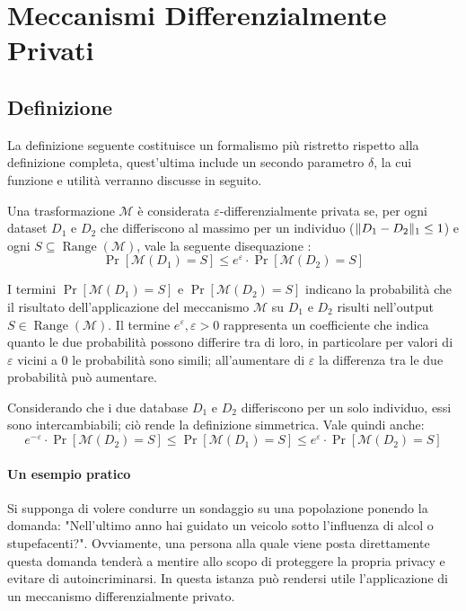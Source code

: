 \chapter{Meccanismi Differenzialmente Privati}

\section{Definizione}
La definizione seguente costituisce un formalismo più ristretto rispetto alla definizione completa, quest'ultima include un secondo parametro $\mathcal{\delta}$, la cui funzione e utilità verranno discusse in seguito.

Una trasformazione $\mathcal{M}$ è considerata $\varepsilon$-differenzialmente privata se, per ogni dataset $D_1$ e $D_2$ che differiscono al massimo per un individuo ($\lVert D_1 - D_2\rVert_1 \le 1$) e ogni $S \subseteq \operatorname{Range}(\mathcal{M})$, vale la seguente disequazione \cite{10.1007/11681878_14}:
\begin{equation}
  \Pr[\mathcal{M}(D_1) = S] \le e^{\varepsilon} \cdot \Pr[\mathcal{M}(D_2) = S]
  \label{eq:e_differential_privacy}
\end{equation}

I termini $\Pr[\mathcal{M}(D_1) = S]$ e $\Pr[\mathcal{M}(D_2) = S]$ indicano la probabilità che il risultato dell'applicazione del meccanismo $\mathcal{M}$ su $D_1$ e $D_2$ risulti nell'output $S \in \operatorname{Range}(\mathcal{M})$.
Il termine $e^\varepsilon, \varepsilon > 0$ rappresenta un coefficiente che indica quanto le due probabilità possono differire tra di loro, in particolare per valori di $\varepsilon$ vicini a $0$ le probabilità sono simili; all'aumentare di $\varepsilon$ la differenza tra le due probabilità può aumentare.

Considerando che i due database $D_1$ e $D_2$ differiscono per un solo individuo, essi sono intercambiabili; ciò rende la definizione simmetrica. Vale quindi anche:
\begin{equation}
  e^{-\varepsilon} \cdot \Pr[\mathcal{M}(D_2) = S] \le \Pr[\mathcal{M}(D_1) = S] \le e^{\varepsilon} \cdot \Pr[\mathcal{M}(D_2) = S]
  \label{eq:e_differential_privacy_symm}
\end{equation}

\subsubsection{Un esempio pratico}
\label{ex:coint_toss}
Si supponga di volere condurre un sondaggio su una popolazione ponendo la domanda: "Nell'ultimo anno hai guidato un veicolo sotto l'influenza di alcol o stupefacenti?".
Ovviamente, una persona alla quale viene posta direttamente questa domanda tenderà a mentire allo scopo di proteggere la propria privacy e evitare di autoincriminarsi. In questa istanza può rendersi utile l'applicazione di un meccanismo differenzialmente privato.

